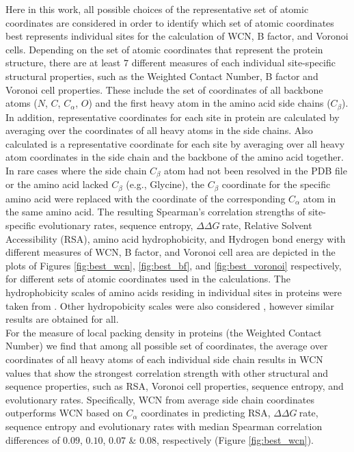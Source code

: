 \documentclass[11pt]{article}
\newcommand{\ddg}{$\Delta\Delta G~$}
\begin{document}
    Here in this work, all possible choices of the representative set of atomic coordinates are considered in order to identify which set of atomic coordinates best represents individual sites for the calculation of WCN, B factor, and Voronoi cells. Depending on the set of atomic coordinates that represent the protein structure, there are at least $7$ different measures of each individual site-specific structural properties, such as the Weighted Contact Number, B factor and Voronoi cell properties. These include the set of coordinates of all backbone atoms ($N$, $C$, $C_\alpha$, $O$) and the first heavy atom in the amino acid side chains ($C_\beta$). In addition, representative coordinates for each site in protein are calculated by averaging over the coordinates of all heavy atoms in the side chains. Also calculated is a representative coordinate for each site by averaging over all heavy atom coordinates in the side chain and the backbone of the amino acid together. In rare cases where the side chain $C_\beta$ atom had not been resolved in the PDB file or the amino acid lacked $C_\beta$ (e.g., Glycine), the $C_\beta$ coordinate for the specific amino acid were replaced with the coordinate of the corresponding $C_\alpha$ atom in the same amino acid. The resulting Spearman's correlation strengths of site-specific evolutionary rates, sequence entropy, \ddg rate, Relative Solvent Accessibility (RSA), amino acid hydrophobicity, and Hydrogen bond energy with different measures of WCN, B factor, and Voronoi cell area are depicted in the plots of Figures \ref{fig:best_wcn}, \ref{fig:best_bf}, and \ref{fig:best_voronoi} respectively, for different sets of atomic coordinates used in the calculations. The hydrophobicity scales of amino acids residing in individual sites in proteins were taken from \cite{hessa_recognition_2005}. Other hydropobicity scales were also considered \cite{wimley_experimentally_1996, kyte_simple_1982}, however similar results are obtained for all. \\



    For the measure of local packing density in proteins (the Weighted Contact Number) we find that among all possible set of coordinates, the average over coordinates of all heavy atoms of each individual side chain results in WCN values that show the strongest correlation strength with other structural and sequence properties, such as RSA, Voronoi cell properties, sequence entropy, and evolutionary rates. Specifically, WCN from average side chain coordinates outperforms WCN based on $C_\alpha$ coordinates in predicting RSA, \ddg rate, sequence entropy and evolutionary rates with median Spearman correlation differences of $0.09$, $0.10$, $0.07$ \& $0.08$, respectively (Figure \ref{fig:best_wcn}). \\
\end{document}
